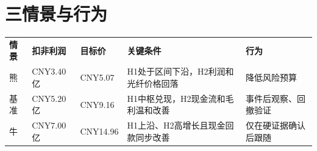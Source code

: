 \section{三情景与行为}
\begin{exhibitbox}
\begin{tabularx}{\exhibitboxwidth}{L{1.3cm}R{1.8cm}R{1.8cm}X L{2.7cm}}
\textbf{情景} & \textbf{扣非利润} & \textbf{目标价} & \textbf{关键条件} & \textbf{行为} \\
熊 & CNY3.40亿 & CNY5.07 & H1处于区间下沿，H2利润和光纤价格回落 & 降低风险预算 \\
基准 & CNY5.20亿 & CNY9.16 & H1中枢兑现，H2现金流和毛利温和改善 & 事件后观察、回撤验证 \\
牛 & CNY7.00亿 & CNY14.96 & H1上沿、H2高增长且现金回款同步改善 & 仅在硬证据确认后跟随 \\
\end{tabularx}
\end{exhibitbox}
